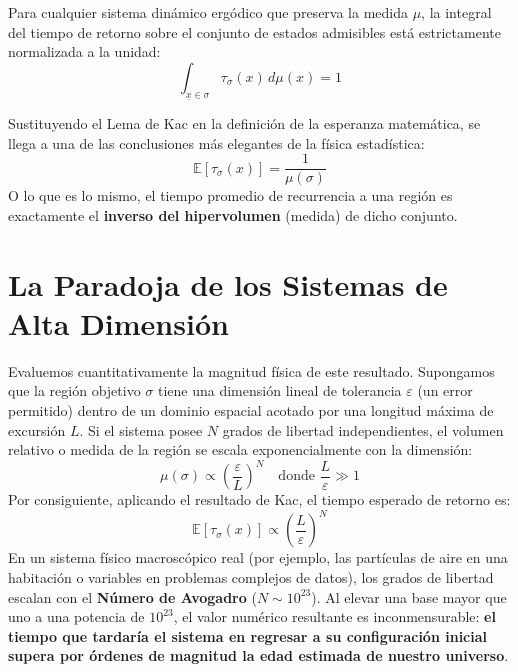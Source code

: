 \begin{lema}
Para cualquier sistema dinámico ergódico que preserva la medida $\mu$, la integral del tiempo de retorno sobre el conjunto de estados admisibles está estrictamente normalizada a la unidad:
\begin{equation}
    \int_{\underline{x} \in \sigma} \tau_\sigma(x) \, d\mu(x) = 1
\end{equation}
\end{lema}
\noindent
Sustituyendo el Lema de Kac en la definición de la esperanza matemática, se llega a una de las conclusiones más elegantes de la física estadística:
\begin{equation}
    \mathbb{E}[\tau_\sigma(x)] = \frac{1}{\mu(\sigma)}
\end{equation}
O lo que es lo mismo, el tiempo promedio de recurrencia a una región es exactamente el \textbf{inverso del hipervolumen} (medida) de dicho conjunto.


\section{La Paradoja de los Sistemas de Alta Dimensión}

Evaluemos cuantitativamente la magnitud física de este resultado. Supongamos que la región objetivo $\sigma$ tiene una dimensión lineal de tolerancia $\varepsilon$ (un error permitido) dentro de un dominio espacial acotado por una longitud máxima de excursión $L$. Si el sistema posee $N$ grados de libertad independientes, el volumen relativo o medida de la región se escala exponencialmente con la dimensión:
\begin{equation}
    \mu(\sigma) \propto \left( \frac{\varepsilon}{L} \right)^N \quad \text{donde } \frac{L}{\varepsilon} \gg 1
\end{equation}
\noindent
Por consiguiente, aplicando el resultado de Kac, el tiempo esperado de retorno es:
\begin{equation}
    \mathbb{E}[\tau_\sigma(x)] \propto \left( \frac{L}{\varepsilon} \right)^N
\end{equation}
\noindent
En un sistema físico macroscópico real (por ejemplo, las partículas de aire en una habitación o variables en problemas complejos de datos), los grados de libertad escalan con el \textbf{Número de Avogadro} ($N \sim 10^{23}$). 
\noindent
Al elevar una base mayor que uno a una potencia de $10^{23}$, el valor numérico resultante es inconmensurable: \textbf{el tiempo que tardaría el sistema en regresar a su configuración inicial supera por órdenes de magnitud la edad estimada de nuestro universo}.


